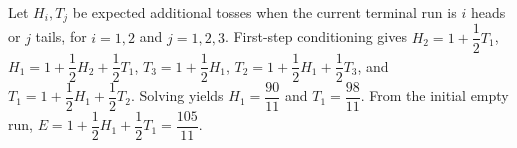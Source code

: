 Let $H_i,T_j$ be expected additional tosses when the current terminal run is $i$ heads or $j$ tails, for $i=1,2$ and $j=1,2,3$. First-step conditioning gives $H_2=1+\dfrac{1}{2}T_1$, $H_1=1+\dfrac{1}{2}H_2+\dfrac{1}{2}T_1$, $T_3=1+\dfrac{1}{2}H_1$, $T_2=1+\dfrac{1}{2}H_1+\dfrac{1}{2}T_3$, and $T_1=1+\dfrac{1}{2}H_1+\dfrac{1}{2}T_2$. Solving yields $H_1=\dfrac{90}{11}$ and $T_1=\dfrac{98}{11}$. From the initial empty run, $E=1+\dfrac{1}{2}H_1+\dfrac{1}{2}T_1=\boxed{\dfrac{105}{11}}$.
